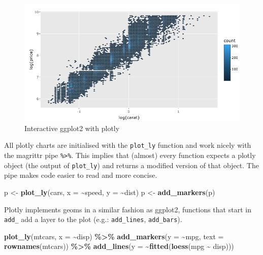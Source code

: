 \documentclass[
  10pt,
]{krantz}
\makeatletter
\newenvironment{Shaded}{\begin{snugshade}}{\end{snugshade}}
\newcommand{\DataTypeTok}[1]{\textcolor[rgb]{0.27,0.27,0.27}{#1}}
\newcommand{\KeywordTok}[1]{\textcolor[rgb]{0.27,0.27,0.27}{\textbf{#1}}}
\newcommand{\NormalTok}[1]{#1}
\newcommand{\OperatorTok}[1]{\textcolor[rgb]{0.43,0.43,0.43}{\textbf{#1}}}
\newcommand{\StringTok}[1]{\textcolor[rgb]{0.5,0.5,0.5}{#1}}
\newenvironment{kframe}{%
\medskip{}
\setlength{\fboxsep}{.8em}
 \def\at@end@of@kframe{}%
 \ifinner\ifhmode%
  \def\at@end@of@kframe{\end{minipage}}%
  \begin{minipage}{\columnwidth}%
 \fi\fi%
 \def\FrameCommand##1{\hskip\@totalleftmargin \hskip-\fboxsep
 \colorbox{shadecolor}{##1}\hskip-\fboxsep
     \hskip-\linewidth \hskip-\@totalleftmargin \hskip\columnwidth}%
 \MakeFramed {\advance\hsize-\width
   \@totalleftmargin\z@ \linewidth\hsize
   \@setminipage}}%
 {\par\unskip\endMakeFramed%
 \at@end@of@kframe}
\renewenvironment{Shaded}{\begin{kframe}}{\end{kframe}}
\makeatother
\begin{document}
\begin{figure}[H]

{\centering \includegraphics[width=1\linewidth]{images/03-ggplotly} 

}

\caption{Interactive ggplot2 with plotly}\label{fig:plotly-ggplotly-diagram}
\end{figure}

All plotly charts are initialised with the \texttt{plot\_ly} function and work nicely with the magrittr \citep{R-magrittr} pipe \texttt{\%\textgreater{}\%}. This implies that (almost) every function expects a plotly object (the output of \texttt{plot\_ly}) and returns a modified version of that object. The pipe makes code easier to read and more concise.

\begin{Shaded}
\begin{Highlighting}[]
\NormalTok{p <{-}}\StringTok{ }\KeywordTok{plot\_ly}\NormalTok{(cars, }\DataTypeTok{x =} \OperatorTok{\textasciitilde{}}\NormalTok{speed, }\DataTypeTok{y =} \OperatorTok{\textasciitilde{}}\NormalTok{dist) }
\NormalTok{p <{-}}\StringTok{ }\KeywordTok{add\_markers}\NormalTok{(p)}
\end{Highlighting}
\end{Shaded}

Plotly implements geoms in a similar fashion as ggplot2, functions that start in \texttt{add\_} add a layer to the plot (e.g.: \texttt{add\_lines}, \texttt{add\_bars}).

\begin{Shaded}
\begin{Highlighting}[]
\KeywordTok{plot\_ly}\NormalTok{(mtcars, }\DataTypeTok{x =} \OperatorTok{\textasciitilde{}}\NormalTok{disp) }\OperatorTok{\%>\%}\StringTok{ }
\StringTok{  }\KeywordTok{add\_markers}\NormalTok{(}\DataTypeTok{y =} \OperatorTok{\textasciitilde{}}\NormalTok{mpg, }\DataTypeTok{text =} \KeywordTok{rownames}\NormalTok{(mtcars)) }\OperatorTok{\%>\%}\StringTok{ }
\StringTok{  }\KeywordTok{add\_lines}\NormalTok{(}\DataTypeTok{y =} \OperatorTok{\textasciitilde{}}\KeywordTok{fitted}\NormalTok{(}\KeywordTok{loess}\NormalTok{(mpg }\OperatorTok{\textasciitilde{}}\StringTok{ }\NormalTok{disp)))}
\end{Highlighting}
\end{Shaded}
\end{document}
